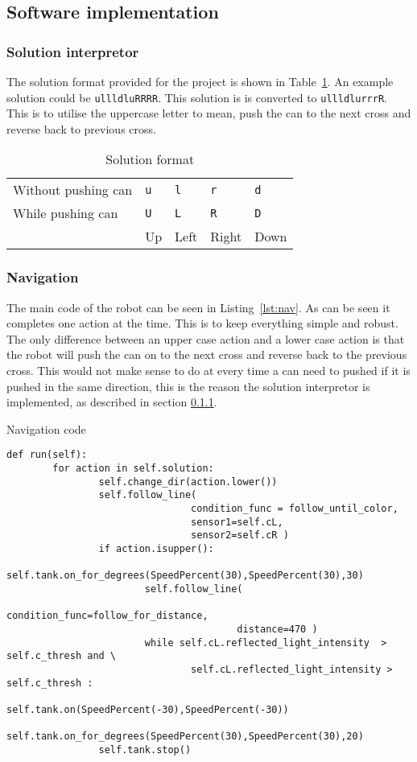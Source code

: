 \documentclass[../../main.tex]{subfiles}
\begin{document}
\subsection{Software implementation}%
\label{sub:software_implementation}

\subsubsection{Solution interpretor}%
\label{ssub:solution_intepretor}

The solution format provided for the project is shown in Table~\ref{tab:solution_format}.
An example solution could be \texttt{ullldluRRRR}.
This solution is is converted to \texttt{ullldlurrrR}. This is to utilise the uppercase letter to
mean, push the can to the next cross and reverse back to previous cross.

\begin{table}[h]
	\centering
	\caption{Solution format}
	\label{tab:solution_format}
	\begin{tabular}{*{5}{l}}
		\toprule
		Without pushing can & \tt u &\tt  l & \tt r & \tt d \\
		While pushing can & \tt U & \tt L & \tt R & \tt D \\
		\cmidrule{2-5}
											& Up & Left & Right & Down\\
											\bottomrule
	\end{tabular}
\end{table}


\subsubsection{Navigation}%
\label{ssub:navigation}

The main code of the robot can be seen in Listing~\ref{lst:nav}.
As can be seen it completes one action at the time.
This is to keep everything simple and robust.
The only difference between an upper case action and a lower case action
is that the robot will push the can on to the next cross and reverse back to the previous
cross. This would not make sense to do at every time a can need to pushed if it is pushed in
the same direction, this is the reason the solution interpretor is implemented, as described in
section \ref{ssub:solution_intepretor}.

\begin{listing}
	\caption{Navigation code}	
	\label{lst:nav}
	\begin{verbatim}
def run(self):
		for action in self.solution:
				self.change_dir(action.lower())
				self.follow_line(
								condition_func = follow_until_color,
								sensor1=self.cL,
								sensor2=self.cR )
				if action.isupper():
						self.tank.on_for_degrees(SpeedPercent(30),SpeedPercent(30),30)
						self.follow_line(
										condition_func=follow_for_distance,
										distance=470 )
						while self.cL.reflected_light_intensity  > self.c_thresh and \
								self.cL.reflected_light_intensity > self.c_thresh :
								self.tank.on(SpeedPercent(-30),SpeedPercent(-30))
						self.tank.on_for_degrees(SpeedPercent(30),SpeedPercent(30),20)
				self.tank.stop()
	\end{verbatim}
\end{listing}
\end{document}
